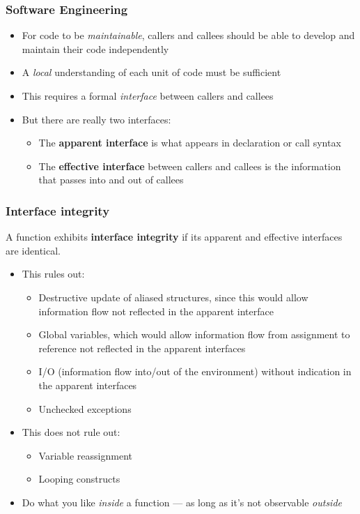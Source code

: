\documentclass[12pt]{beamer}
\begin{document}
\begin{frame}[fragile]
\frametitle{Software Engineering}
\begin{itemize}
\item For code to be \emph{maintainable}, callers and callees should be
  able to develop and maintain their code independently
\item A \emph{local} understanding of each unit of code must be sufficient
\item This requires a formal \emph{interface} between callers and callees
\item But there are really two interfaces:
  \begin{itemize}
  \item The \textbf{apparent interface} is what appears in declaration
    or call syntax
  \item The \textbf{effective interface} between callers and
    callees is the information that passes into and out of callees
  \end{itemize}
\end{itemize}

\end{frame}


\begin{frame}[fragile]
\frametitle{Interface integrity}

A function exhibits \textbf{interface integrity} if its apparent and
effective interfaces are identical.

\begin{itemize}
\item This rules out:
  \begin{itemize}
  \item Destructive update of aliased structures, since this would allow
    information flow not reflected in the apparent interface
  \item Global variables, which would allow information flow from
    assignment to reference not reflected in the apparent interfaces
  \item I/O (information flow into/out of the environment) without
    indication in the apparent interfaces
  \item Unchecked exceptions
  \end{itemize}
\item This does not rule out:
  \begin{itemize}
  \item Variable reassignment
  \item Looping constructs
  \end{itemize}
\item Do what you like \emph{inside} a function --- as long as it's not
  observable \emph{outside}
\end{itemize}

\end{frame}
\end{document}
